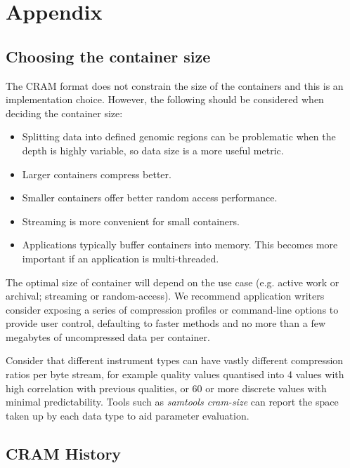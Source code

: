 \documentclass[a4paper]{article}
\begin{document}
\section{\textbf{Appendix}}
\subsection{\textbf{Choosing the container size}}

The CRAM format does not constrain the size of the containers and this is an implementation choice.
However, the following should be considered when deciding the container size:

\begin{itemize}
\item Splitting data into defined genomic regions can be problematic when the depth is highly variable, so data size is a more useful metric.

\item Larger containers compress better.

\item Smaller containers offer better random access performance.

\item Streaming is more convenient for small containers.

\item Applications typically buffer containers into memory.  This becomes more important if an application is multi-threaded.
\end{itemize}

The optimal size of container will depend on the use case (e.g. active work or archival; streaming or random-access).
We recommend application writers consider exposing a series of compression profiles or command-line options to provide user control, defaulting to faster methods and no more than a few megabytes of uncompressed data per container.

Consider that different instrument types can have vastly different compression ratios per byte stream, for example quality values quantised into 4 values with high correlation with previous qualities, or 60 or more discrete values with minimal predictability.
Tools such as \emph{samtools cram-size} can report the space taken up by each data type to aid parameter evaluation.

\newpage

\subsection{CRAM History}
\end{document}
